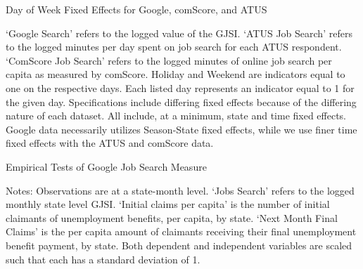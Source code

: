 \documentclass[12pt]{article}
\begin{document}
\begin{spacing}{2}
\begin{sidewaystable}[H]
\caption{Day of Week Fixed Effects for Google, comScore, and ATUS}
\label{tab:dayofweek}
\begin{center}

\begin{tablenotes}
\item  `Google Search' refers to the logged value of the GJSI. `ATUS Job Search' refers to the logged minutes per day spent on job search for each ATUS respondent. `ComScore Job Search' refers to the logged minutes of online job search per capita as measured by comScore. Holiday and Weekend are indicators equal to one on the respective days. Each listed day represents an indicator equal to 1 for the given day. Specifications include differing fixed effects because of the differing nature of each dataset. All include, at a minimum, state and time fixed effects. Google data necessarily utilizes Season-State fixed effects, while we use finer time fixed effects with the ATUS and comScore data.
\end{tablenotes}
\end{center}
\end{sidewaystable}

\begin{sidewaystable}[H]
\caption{Empirical Tests of Google Job Search Measure}
\label{tab:macroeffects}
\begin{center}

\begin{tablenotes}
\item Notes: Observations are at a state-month level. `Jobs Search' refers to the logged monthly state level GJSI. `Initial claims per capita’ is the number of initial claimants of unemployment benefits, per capita, by state. `Next Month Final Claims' is the per capita amount of claimants receiving their final unemployment benefit payment, by state. Both dependent and independent variables are scaled such that each has a standard deviation of 1.
\end{tablenotes}
\end{center}
\end{sidewaystable}


\end{spacing}
\end{document}
